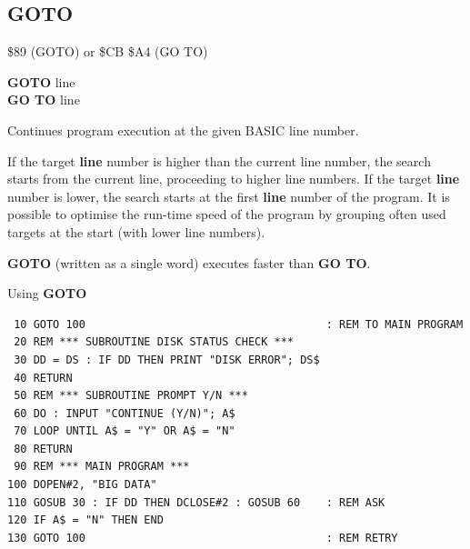 
\newpage
\subsection{GOTO}
\begin{description}[leftmargin=2cm,style=nextline]
\item [Token:]    \$89 (GOTO) or \$CB \$A4 (GO TO)

\item [Format:]   {\bf GOTO} line \\
                  {\bf GO TO} line

\item [Usage:]    Continues program execution at the given BASIC line number.

\item [Remarks:]  If the target {\bf line} number is higher than the current line number, the search starts from the current line, proceeding to higher line numbers. If the target {\bf line} number is lower, the search starts at the first {\bf line} number of the program. It is possible to optimise the run-time speed of the program by grouping often used targets at the start (with lower line numbers).

                  {\bf GOTO} (written as a single word) executes faster than {\bf GO TO}.

\item [Example:]  Using {\bf GOTO}

\begin{tcolorbox}[colback=black,coltext=white]
\verbatimfont{\codefont}
\begin{verbatim}
 10 GOTO 100                                     : REM TO MAIN PROGRAM
 20 REM *** SUBROUTINE DISK STATUS CHECK ***
 30 DD = DS : IF DD THEN PRINT "DISK ERROR"; DS$
 40 RETURN
 50 REM *** SUBROUTINE PROMPT Y/N ***
 60 DO : INPUT "CONTINUE (Y/N)"; A$
 70 LOOP UNTIL A$ = "Y" OR A$ = "N"
 80 RETURN
 90 REM *** MAIN PROGRAM ***
100 DOPEN#2, "BIG DATA"
110 GOSUB 30 : IF DD THEN DCLOSE#2 : GOSUB 60    : REM ASK
120 IF A$ = "N" THEN END
130 GOTO 100                                     : REM RETRY
\end{verbatim}
\end{tcolorbox}
\end{description}


\newpage
